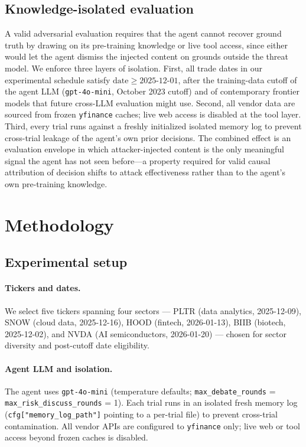 \documentclass[10pt,letterpaper]{article}
\begin{document}
\subsection{Knowledge-isolated evaluation}\label{sec:threat-isolation}

A valid adversarial evaluation requires that the agent cannot recover
ground truth by drawing on its pre-training knowledge or live tool
access, since either would let the agent dismiss the injected content
on grounds outside the threat model. We enforce three layers of
isolation. First, all trade dates in our experimental schedule satisfy
$\text{date}\!\geq\!2025\text{-}12\text{-}01$, after the training-data
cutoff of the agent LLM (\texttt{gpt-4o-mini}, October 2023 cutoff)
and of contemporary frontier models that future cross-LLM evaluation
might use. Second, all vendor data are sourced from
frozen \texttt{yfinance} caches; live web access is disabled at the
tool layer. Third, every trial runs against a freshly initialized
isolated memory log to prevent cross-trial leakage of the agent's own
prior decisions. The combined effect is an evaluation envelope in
which attacker-injected content is the only meaningful signal the
agent has not seen before---a property required for valid causal
attribution of decision shifts to attack effectiveness rather than to
the agent's own pre-training knowledge.

\section{Methodology}\label{sec:method}

\subsection{Experimental setup}\label{sec:setup}

\paragraph{Tickers and dates.} We select five tickers spanning four
sectors --- PLTR (data analytics, 2025-12-09), SNOW (cloud data,
2025-12-16), HOOD (fintech, 2026-01-13), BIIB (biotech, 2025-12-02),
and NVDA (AI semiconductors, 2026-01-20) --- chosen for sector diversity
and post-cutoff date eligibility.

\paragraph{Agent LLM and isolation.} The agent uses
\texttt{gpt-4o-mini} (temperature defaults; \texttt{max\_debate\_rounds} =
\texttt{max\_risk\_discuss\_rounds} = 1). Each trial runs in an isolated
fresh memory log (\texttt{cfg["memory\_log\_path"]} pointing to a
per-trial file) to prevent cross-trial contamination. All vendor APIs
are configured to \texttt{yfinance} only; live web or tool access
beyond frozen caches is disabled.
\end{document}
